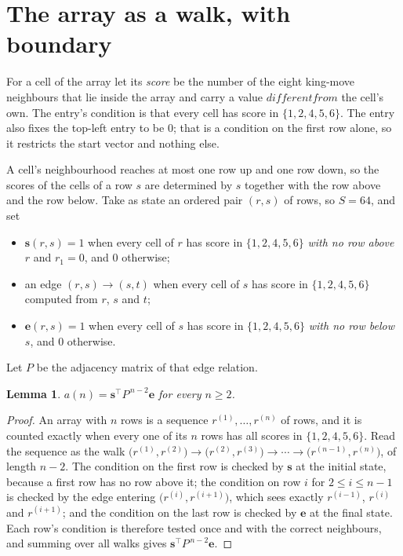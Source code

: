 \documentclass[11pt,a4paper]{article}
\theoremstyle{plain}
\newtheorem{lemma}[theorem]{Lemma}
\theoremstyle{definition}
\begin{document}
\section{The array as a walk, with boundary}

For a cell of the array let its \emph{score} be the number of the eight king-move neighbours that lie inside
the array and carry a value $different from$ the cell's own. The entry's condition is that every cell
has score in $\{1,2,4,5,6\}$. The entry also fixes the top-left entry to be $0$; that is a condition on the first row alone, so it restricts the start vector and nothing else.

A cell's neighbourhood reaches at most one row up and one row down, so the scores of the
cells of a row $s$ are determined by $s$ together with the row above and the row below.
Take as state an ordered pair $(r,s)$ of rows, so $S=64$, and set
\begin{itemize}
\item $\mathbf{s}(r,s)=1$ when every cell of $r$ has score in $\{1,2,4,5,6\}$ \emph{with no row
above $r$} and $r_1=0$, and $0$ otherwise;
\item an edge $(r,s)\to(s,t)$ when every cell of $s$ has score in $\{1,2,4,5,6\}$ computed from
$r$, $s$ and $t$;
\item $\mathbf{e}(r,s)=1$ when every cell of $s$ has score in $\{1,2,4,5,6\}$ \emph{with no row
below $s$}, and $0$ otherwise.
\end{itemize}
Let $P$ be the adjacency matrix of that edge relation.

\begin{lemma}\label{lem:walk}
$a(n)=\mathbf{s}^{\!\top}P^{\,n-2}\mathbf{e}$ for every $n\ge2$.
\end{lemma}

\begin{proof}
An array with $n$ rows is a sequence $r^{(1)},\dots,r^{(n)}$ of rows, and it is counted
exactly when every one of its $n$ rows has all scores in $\{1,2,4,5,6\}$. Read the sequence as the
walk $\bigl(r^{(1)},r^{(2)}\bigr)\to\bigl(r^{(2)},r^{(3)}\bigr)\to\cdots\to
\bigl(r^{(n-1)},r^{(n)}\bigr)$, of length $n-2$. The condition on the first row is
checked by $\mathbf{s}$ at the initial state, because a first row has no row above it; the
condition on row $i$ for $2\le i\le n-1$ is checked by the edge entering
$\bigl(r^{(i)},r^{(i+1)}\bigr)$, which sees exactly $r^{(i-1)}$, $r^{(i)}$ and
$r^{(i+1)}$; and the condition on the last row is checked by $\mathbf{e}$ at the final
state. Each row's condition is therefore tested once and with the correct neighbours, and
summing over all walks gives $\mathbf{s}^{\!\top}P^{\,n-2}\mathbf{e}$.
\end{proof}
\end{document}

